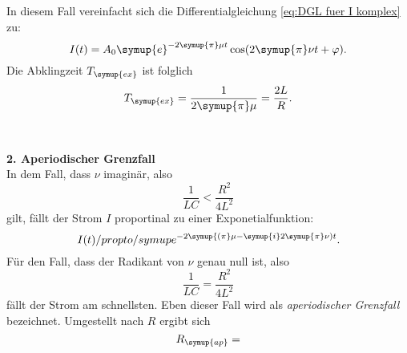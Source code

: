 In diesem Fall vereinfacht sich die Differentialgleichung \eqref{eq:DGL fuer I komplex} zu:
\begin{equation*}
    I(t)=A_{0} \symup{e}^{-2\symup{\pi}\mu t} \cos(2\symup{\pi}\nu t + \varphi).
\end{equation*}
Die Abklingzeit $T_{\symup{ex}}$ ist folglich
\begin{equation}
    T_{\symup{ex}}=\frac{1}{2\symup{\pi}\mu}=\frac{2L}{R}.
    \label{eq:Abklingzeit}
\end{equation}
\\
\\
\textbf{2. Aperiodischer Grenzfall} \\
In dem Fall, dass $\nu$ imaginär, also
\begin{equation*}
    \frac{1}{LC} < \frac{R^{2}}{4L^{2}}
\end{equation*}
gilt, fällt der Strom $I$ proportinal zu einer Exponetialfunktion:
\begin{equation*}
    I(t) /propto /symup{e}^{-2\symup{(\pi}\mu-\symup{i}2\symup{\pi}\nu)t}.
\end{equation*}
Für den Fall, dass der Radikant von $\nu$ genau null ist, also
\begin{equation*}
    \frac{1}{LC} = \frac{R^{2}}{4L^{2}}
\end{equation*}
fällt der Strom am schnellsten. Eben dieser Fall wird als \textit{aperiodischer Grenzfall} bezeichnet. Umgestellt nach $R$ ergibt sich
\begin{equation}
    R_{\symup{ap}} = 
\end{equation}